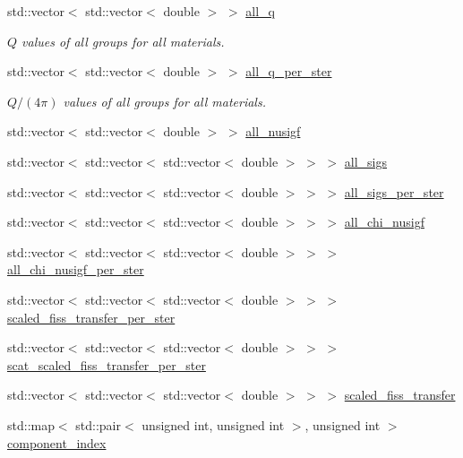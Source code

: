 \begin{DoxyCompactItemize}
std\+::vector$<$ std\+::vector$<$ double $>$ $>$ \hyperlink{class_equation_base_add5be1036bc07500adc0d925020798a6}{all\+\_\+q}
\begin{DoxyCompactList}\small\item\em $Q$ values of all groups for all materials. \end{DoxyCompactList}\item 
std\+::vector$<$ std\+::vector$<$ double $>$ $>$ \hyperlink{class_equation_base_a6a633374c56fe767325b5c0860269fbf}{all\+\_\+q\+\_\+per\+\_\+ster}
\begin{DoxyCompactList}\small\item\em $Q/(4\pi)$ values of all groups for all materials. \end{DoxyCompactList}\item 
std\+::vector$<$ std\+::vector$<$ double $>$ $>$ \hyperlink{class_equation_base_a8c88d4b3e532cb639cea6e653dee5cfc}{all\+\_\+nusigf}
\item 
std\+::vector$<$ std\+::vector$<$ std\+::vector$<$ double $>$ $>$ $>$ \hyperlink{class_equation_base_a6775388f6b8dcd903a0f95443b2e8c0d}{all\+\_\+sigs}
\item 
std\+::vector$<$ std\+::vector$<$ std\+::vector$<$ double $>$ $>$ $>$ \hyperlink{class_equation_base_abf2c1a575944b0661bb48e2380c269a0}{all\+\_\+sigs\+\_\+per\+\_\+ster}
\item 
std\+::vector$<$ std\+::vector$<$ std\+::vector$<$ double $>$ $>$ $>$ \hyperlink{class_equation_base_ab1bdb760ee1fb27a3e211f5dbdaef83d}{all\+\_\+chi\+\_\+nusigf}
\item 
std\+::vector$<$ std\+::vector$<$ std\+::vector$<$ double $>$ $>$ $>$ \hyperlink{class_equation_base_a98a7eeab206ded9b3444e074d1f89ea8}{all\+\_\+chi\+\_\+nusigf\+\_\+per\+\_\+ster}
\item 
std\+::vector$<$ std\+::vector$<$ std\+::vector$<$ double $>$ $>$ $>$ \hyperlink{class_equation_base_a5452991f01541261dba1e0322a0f5392}{scaled\+\_\+fiss\+\_\+transfer\+\_\+per\+\_\+ster}
\item 
std\+::vector$<$ std\+::vector$<$ std\+::vector$<$ double $>$ $>$ $>$ \hyperlink{class_equation_base_ad445f7f2e377cc05f2003de4d632baa7}{scat\+\_\+scaled\+\_\+fiss\+\_\+transfer\+\_\+per\+\_\+ster}
\item 
std\+::vector$<$ std\+::vector$<$ std\+::vector$<$ double $>$ $>$ $>$ \hyperlink{class_equation_base_aadf1651f816a1a65301faac3cd075aeb}{scaled\+\_\+fiss\+\_\+transfer}
\item 
std\+::map$<$ std\+::pair$<$ unsigned int, unsigned int $>$, unsigned int $>$ \hyperlink{class_equation_base_a7e2b3d305d1f1f7799acff6c86bc67f8}{component\+\_\+index}

\end{DoxyCompactItemize}
